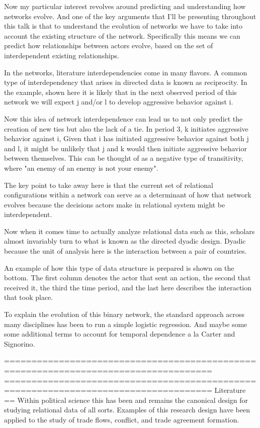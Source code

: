 Now my particular interest revolves around predicting and understanding how networks evolve. And one of the key arguments that I'll be presenting throughout this talk is that to understand the evolution of networks we have to take into account the existing structure of the network. Specifically this means we can predict how relationships between actors evolve, based on the set of interdependent existing relationships.

In the networks, literature interdependencies come in many flavors. A common type of interdependency that arises in directed data is known as reciprocity. In the example, shown here it is likely that in the next observed period of this network we will expect j and/or l to develop aggressive behavior against i. 

Now this idea of network interdependence can lead us to not only predict the creation of new ties but also the lack of a tie. In period 3, k initiates aggressive behavior against i, Given that i has initiated aggressive behavior against both j and l, it might be unlikely that j and k would then initiate aggressive behavior between themselves. This can be thought of as a negative type of transitivity, where "an enemy of an enemy is not your enemy".

The key point to take away here is that the current set of relational configurations within a network can serve as a determinant of how that network evolves because the decisions actors make in relational system might be interdependent. 

Now when it comes time to actually analyze relational data such as this, scholars almost invariably turn to what is known as the directed dyadic design. Dyadic because the unit of analysis here is the interaction between a pair of countries. 

An example of how this type of data structure is prepared is shown on the bottom. The first column denotes the actor that sent an action, the second that received it, the third the time period, and the last here describes the interaction that took place. 

To explain the evolution of this binary network, the standard approach across many disciplines has been to run a simple logistic regression. And maybe some some additional terms to account for temporal dependence a la Carter and Signorino.

====================================================================================
====================================================================================
Literature
==
Within political science this has been and remains the canonical design for studying relational data of all sorts. Examples of this research design have been applied to the study of trade flows, conflict, and trade agreement formation. 

